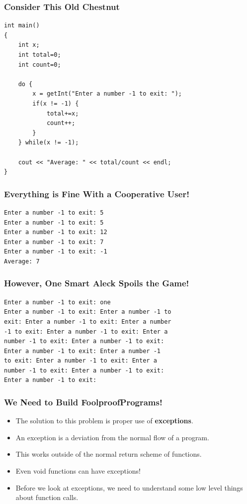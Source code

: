 \documentclass{beamer}
\begin{document}
\begin{frame}[fragile]
    \frametitle{Consider This Old Chestnut}
    {\scriptsize
    \begin{verbatim}
int main()
{
    int x;
    int total=0;
    int count=0;
    
    do {
        x = getInt("Enter a number -1 to exit: ");
        if(x != -1) { 
            total+=x;
            count++;
        }
    } while(x != -1);
    
    cout << "Average: " << total/count << endl;
}
\end{verbatim}
}
\end{frame}

\begin{frame}[fragile]
    \frametitle{Everything is Fine With a Cooperative User!}
    \begin{verbatim}
Enter a number -1 to exit: 5
Enter a number -1 to exit: 5
Enter a number -1 to exit: 12
Enter a number -1 to exit: 7
Enter a number -1 to exit: -1
Average: 7
    \end{verbatim}
\end{frame}

\begin{frame}[fragile]
    \frametitle{However, One Smart Aleck Spoils the Game!}
    \begin{verbatim}
Enter a number -1 to exit: one
Enter a number -1 to exit: Enter a number -1 to 
exit: Enter a number -1 to exit: Enter a number 
-1 to exit: Enter a number -1 to exit: Enter a 
number -1 to exit: Enter a number -1 to exit: 
Enter a number -1 to exit: Enter a number -1 
to exit: Enter a number -1 to exit: Enter a 
number -1 to exit: Enter a number -1 to exit: 
Enter a number -1 to exit: 
    \end{verbatim}
\end{frame}

\begin{frame}
    \frametitle{We Need to Build Foolproof\footnotemark Programs!}
    
    \begin{itemize}[<+->]
        \item The solution to this problem is proper use of {\bf exceptions}.
        \item An exception is a deviation from the normal flow of a program.
        \item This works outside of the normal return scheme of functions.
        \item Even void functions can have exceptions!
        \item Before we look at exceptions, we need to understand some low level things about function calls.
    \end{itemize}
    
\end{frame}
\end{document}
